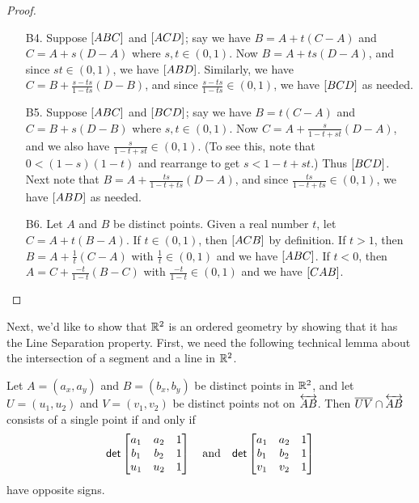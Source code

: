 \begin{proof}
\begin{itemize}
\item[B4.] Suppose \([ A B C ]\) and \([ A C D ]\); say we have \(B = A + t(C-A)\) and \(C = A + s(D-A)\) where \(s,t \in (0,1)\).
Now \(B = A + ts(D-A)\), and since \(st \in (0,1)\), we have \([ A B D ]\).
Similarly, we have \(C = B + \frac{s-ts}{1-ts}(D-B)\), and since \(\frac{s-ts}{1-ts} \in (0,1)\), we have \([ B C D ]\) as needed.

\item[B5.] Suppose \([ A B C ]\) and \([ B C D ]\); say we have \(B = t(C-A)\) and \(C = B + s(D-B)\) where \(s,t \in (0,1)\).
Now \(C = A + \frac{s}{1-t+st}(D-A)\), and we also have \(\frac{s}{1-t+st} \in (0,1)\).
(To see this, note that \(0 < (1-s)(1-t)\) and rearrange to get \(s < 1-t+st\).)
Thus \([ B C D ]\).
Next note that \(B = A + \frac{ts}{1-t+ts}(D-A)\), and since \(\frac{ts}{1-t+ts} \in (0,1)\), we have \([ A B D ]\) as needed.

\item[B6.] Let \(A\) and \(B\) be distinct points.
Given a real number \(t\), let \(C = A + t(B-A)\).
If \(t \in (0,1)\), then \([ A C B ]\) by definition.
If \(t > 1\), then \(B = A + \frac{1}{t}(C-A)\) with \(\frac{1}{t} \in (0,1)\) and we have \([ A B C ]\).
If \(t < 0\), then \(A = C + \frac{-t}{1-t}(B-C)\) with \(\frac{-t}{1-t} \in (0,1)\) and we have \([ C A B ]\).
\qedhere
\end{itemize}
\end{proof}

Next, we'd like to show that \(\mathbb{R}^2\) is an ordered geometry by showing that it has the Line Separation property.
First, we need the following technical lemma about the intersection of a segment and a line in \(\mathbb{R}^2\).

\begin{lem}\label{lem:rr2-opp-side-incidence}
Let \(A = (a_x,a_y)\) and \(B = (b_x,b_y)\) be distinct points in \(\mathbb{R}^2\), and let \(U = (u_1, u_2)\) and \(V = (v_1, v_2)\) be distinct points not on \(\overleftrightarrow{AB}\).
Then \(\overline{UV} \cap \overleftrightarrow{AB}\) consists of a single point if and only if \[ \mathsf{det} \begin{bmatrix} a_1 & a_2 & 1 \\ b_1 & b_2 & 1 \\ u_1 & u_2 & 1 \end{bmatrix} \quad \mathrm{and} \quad \mathsf{det} \begin{bmatrix} a_1 & a_2 & 1 \\ b_1 & b_2 & 1 \\ v_1 & v_2 & 1 \end{bmatrix} \] have opposite signs.
\end{lem}

